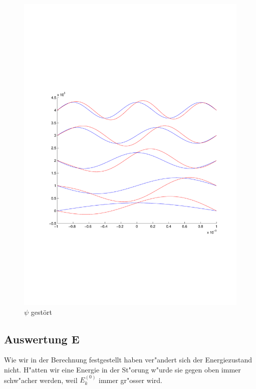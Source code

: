 \begin{refsection}
\begin{figure}
 \centering
 \includegraphics[width=12cm,clip=true,trim=2cm 7cm 1cm 8cm]{efeld/Psi_gestoert.pdf}
 \caption{$\psi$ gest\"ort}
 \label{abb:efeld_psi_gestoert}
\end{figure}



\subsection{Auswertung E}

Wie wir in der Berechnung festgestellt haben ver"andert sich der Energiezustand nicht.
H"atten wir eine Energie in der St"orung w"urde sie gegen oben immer schw"acher werden, weil $E_k^{(0)}$ immer gr"osser wird.


\end{refsection}
